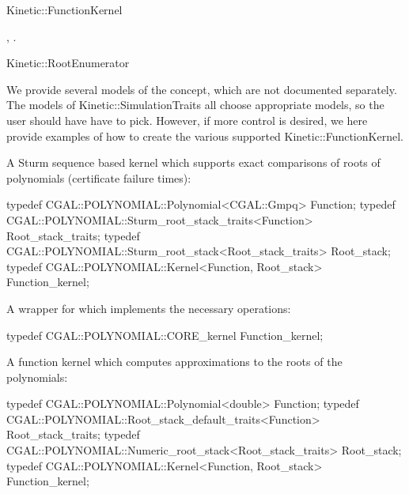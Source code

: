 \begin{ccRefConcept}{Kinetic::FunctionKernel}









\ccHasModels
{}, .

\ccSeeAlso

Kinetic::RootEnumerator

\ccExample

We provide several models of the concept, which are not documented
separately. The models of Kinetic::SimulationTraits all choose
appropriate models, so the user should have have to pick.  However, if
more control is desired, we here provide examples of how to create the
various supported Kinetic::FunctionKernel.

A Sturm sequence based kernel which supports exact comparisons of roots of polynomials (certificate failure times):
\begin{ccExampleCode}
typedef CGAL::POLYNOMIAL::Polynomial<CGAL::Gmpq> Function;
typedef CGAL::POLYNOMIAL::Sturm_root_stack_traits<Function> Root_stack_traits;
typedef CGAL::POLYNOMIAL::Sturm_root_stack<Root_stack_traits> Root_stack;
typedef CGAL::POLYNOMIAL::Kernel<Function, Root_stack> Function_kernel;
\end{ccExampleCode}

A wrapper for  which implements the necessary
operations:
\begin{ccExampleCode}
  typedef CGAL::POLYNOMIAL::CORE_kernel Function_kernel;
\end{ccExampleCode}

A function kernel which computes approximations to the roots of the polynomials:
\begin{ccExampleCode}
typedef CGAL::POLYNOMIAL::Polynomial<double> Function;
typedef CGAL::POLYNOMIAL::Root_stack_default_traits<Function> Root_stack_traits;
typedef CGAL::POLYNOMIAL::Numeric_root_stack<Root_stack_traits> Root_stack;
typedef CGAL::POLYNOMIAL::Kernel<Function, Root_stack> Function_kernel;
\end{ccExampleCode}


\end{ccRefConcept}
